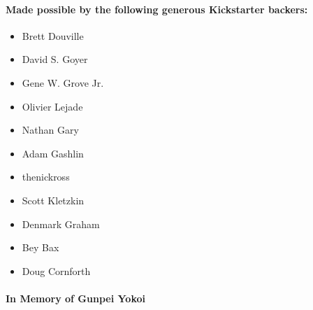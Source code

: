 \documentclass[8pt]{extbook}
\makeatletter
\newcommand{\stopopenany}{\@openrighttrue}
\makeatother
\begin{document}
\paragraph{Made possible by the following generous Kickstarter backers:}  
\begin{itemize}
\item Brett Douville
\item David S. Goyer
\item Gene W. Grove Jr.
\item Olivier Lejade
\item Nathan Gary
\item Adam Gashlin
\item thenickross
\item Scott Kletzkin
\item Denmark Graham
\item Bey Bax
\item Doug Cornforth
\end{itemize}

\paragraph{In Memory of Gunpei Yokoi}

\stopopenany





\end{document}
